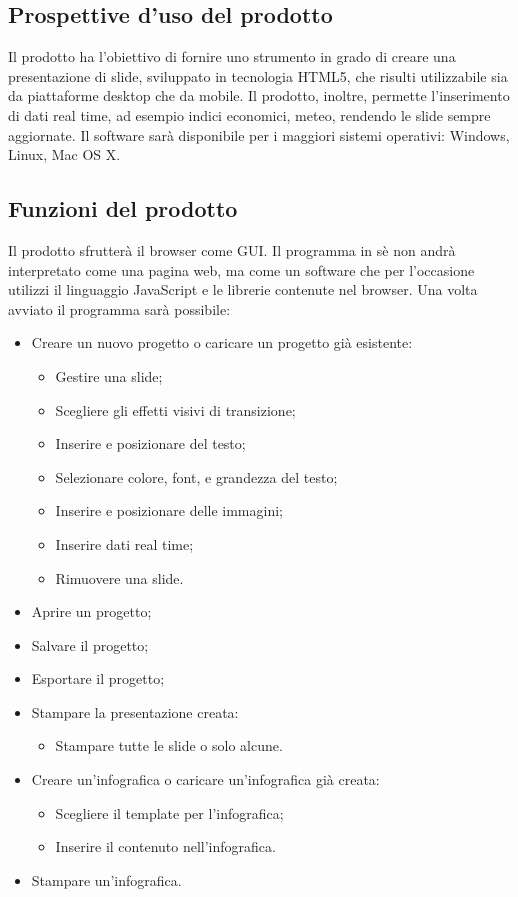 \subsection{Prospettive d'uso del prodotto}
Il prodotto ha l'obiettivo di fornire uno strumento in grado di creare una presentazione di slide, sviluppato in tecnologia \gls{HTML5}, che risulti utilizzabile sia da piattaforme desktop che da mobile. Il prodotto, inoltre, permette l'inserimento di dati real time, ad esempio indici economici, meteo, rendendo le slide sempre aggiornate. Il software sarà disponibile per i maggiori sistemi operativi: Windows, Linux, Mac OS X.

\subsection{Funzioni del prodotto}
Il prodotto sfrutterà il browser come GUI. Il programma in sè non andrà interpretato come una pagina web, ma come un software che per l'occasione utilizzi il linguaggio JavaScript e le librerie contenute nel browser.
Una volta avviato il programma sarà possibile:
\begin{itemize}
	\item Creare un nuovo progetto o caricare un progetto già esistente:
	\begin{itemize}
		\item Gestire una slide;
		\item Scegliere gli effetti visivi di transizione;
		\item Inserire e posizionare del testo;
		\item Selezionare colore, font, e grandezza del testo;
		\item Inserire e posizionare delle immagini;
		\item Inserire dati real time;
		\item Rimuovere una slide.
	\end{itemize}
	\item Aprire un progetto;
	\item Salvare il progetto;
	\item Esportare il progetto;
	\item Stampare la presentazione creata:
	\begin{itemize}
		\item Stampare tutte le slide o solo alcune.
	\end{itemize}
	\item Creare un'infografica o caricare un'infografica già creata:
	\begin{itemize}
		\item Scegliere il template per l'infografica;
		\item Inserire il contenuto nell'infografica.
	\end{itemize}
	\item Stampare un'infografica.
\end{itemize}

